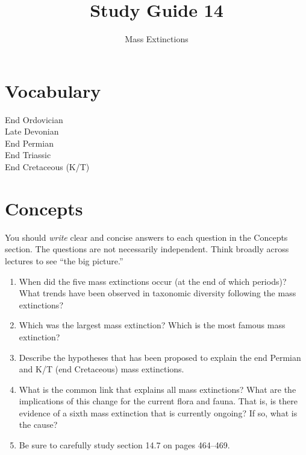 \documentclass[letterpaper]{tufte-handout}
\title{Study Guide 14\hfill}
\author{Mass Extinctions}
\date{} %
\begin{document}
\maketitle	%


\section{Vocabulary}
\vspace{-1\baselineskip}
\begin{multicols}{2}
End Ordovician\\
Late Devonian\\
End Permian\\
End Triassic\\
End Cretaceous (K/T)
\end{multicols}

\section{Concepts}

You should \emph{write} clear and concise answers to each question in the Concepts section.  The questions are not necessarily independent.  Think broadly across lectures to see ``the big picture.'' 

\begin{enumerate}
	\item When did the five mass extinctions occur (at the end of which periods)?  What trends have been observed in taxonomic diversity following the mass extinctions?

	\item Which was the largest mass extinction?  Which is the most famous mass extinction?

	\item Describe the hypotheses that has been proposed to explain the end Permian and K/T (end Cretaceous) mass extinctions.

	\item What is the common link that explains all mass extinctions?  What are the implications of this change for the current flora and fauna. That is, is there evidence of a sixth mass extinction that is currently ongoing? If so, what is the cause?

	\item Be sure to carefully study section 14.7 on pages 464--469. 

\end{enumerate}
\end{document}
